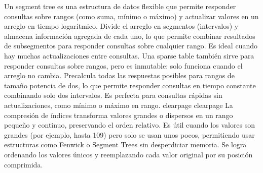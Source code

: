 \markdownRendererDocumentBegin
\markdownRendererSectionBegin
{}\markdownRendererParagraphSeparator
{}\markdownRendererSectionBegin
{}\markdownRendererInterblockSeparator
{}Un segment tree es una estructura de datos flexible que permite responder consultas sobre rangos (como suma, mínimo o máximo) y actualizar valores en un arreglo en tiempo logarítmico. Divide el arreglo en segmentos (intervalos) y almacena información agregada de cada uno, lo que permite combinar resultados de subsegmentos para responder consultas sobre cualquier rango. Es ideal cuando hay muchas actualizaciones entre consultas.\markdownRendererInterblockSeparator
{}\markdownRendererParagraphSeparator
{}
\markdownRendererSectionEnd \markdownRendererSectionBegin
{}\markdownRendererInterblockSeparator
{}Una sparse table también sirve para responder consultas sobre rangos, pero es inmutable: solo funciona cuando el arreglo no cambia. Precalcula todas las respuestas posibles para rangos de tamaño potencia de dos, lo que permite responder consultas en tiempo constante combinando solo dos intervalos. Es perfecta para consultas rápidas sin actualizaciones, como mínimo o máximo en rango.\markdownRendererInterblockSeparator
{}\markdownRendererInterblockSeparator
{}\markdownRendererDollarSign{}\markdownRendererBackslash{}clearpage\markdownRendererDollarSign{}\markdownRendererInterblockSeparator
{}
\markdownRendererSectionEnd \markdownRendererSectionBegin
{}\markdownRendererInterblockSeparator
{}\markdownRendererInterblockSeparator
{}\markdownRendererDollarSign{}\markdownRendererBackslash{}clearpage\markdownRendererDollarSign{}\markdownRendererInterblockSeparator
{}
\markdownRendererSectionEnd \markdownRendererSectionBegin
{}\markdownRendererInterblockSeparator
{}La compresión de índices transforma valores grandes o dispersos en un rango pequeño y continuo, preservando el orden relativo. Es útil cuando los valores son grandes (por ejemplo, hasta \markdownRendererDollarSign{}10\markdownRendererCircumflex{}9\markdownRendererDollarSign{}) pero solo se usan unos pocos, permitiendo usar estructuras como Fenwick o Segment Trees sin desperdiciar memoria. Se logra ordenando los valores únicos y reemplazando cada valor original por su posición comprimida.\markdownRendererInterblockSeparator
{}
\markdownRendererSectionEnd 
\markdownRendererSectionEnd \markdownRendererDocumentEnd